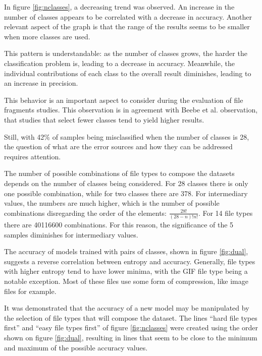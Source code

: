 

In figure \ref{fig:nclasses}, a decreasing trend was observed. An increase in the number of classes appears to be  correlated with a decrease in accuracy. Another relevant aspect of the graph is that the range of the results seems to be smaller when more classes are used.  

This pattern is understandable: as the number of classes grows, the harder the classification problem is, leading to a decrease in accuracy. Meanwhile, the individual contributions of each class to the overall result diminishes, leading to an increase in precision.

This behavior is an important aspect to consider during the evaluation of file fragments studies. This observation is in agreement with Beebe et al. \cite{beebe_sceadan:_2013} observation, that studies that select fewer classes tend to yield higher results. 

Still, with 42\% of samples being misclassified when the number of classes is 28, the question of what are the error sources and how they can be addressed requires attention.

The number of possible combinations of file types to compose the datasets depends on the number of classes being considered. For 28 classes there is only one possible combination, while for two classes there are 378. For intermediary values, the numbers are much higher, which is the number of possible combinations disregarding the order of the elements: $ \frac{28!}{(28-n)!n!}$. For 14 file types there are 40116600 combinations. For this reason, the significance of the 5 samples diminishes for intermediary values.


The accuracy of models trained with pairs of classes, shown in figure \ref{fig:dual}, suggests a reverse correlation between entropy and accuracy.  Generally, file types with higher entropy tend to have lower minima, with the GIF file type being a notable exception. Most of these files use some form of compression, like image files for example.

It was demonstrated that the accuracy of a new model may be manipulated by the selection of file types that will compose the dataset. The lines ``hard file types first'' and ``easy file types first'' of figure \ref{fig:nclasses} were created using the order shown on figure \ref{fig:dual}, resulting in lines that seem to be close to the minimum and maximum of the possible accuracy values. 

